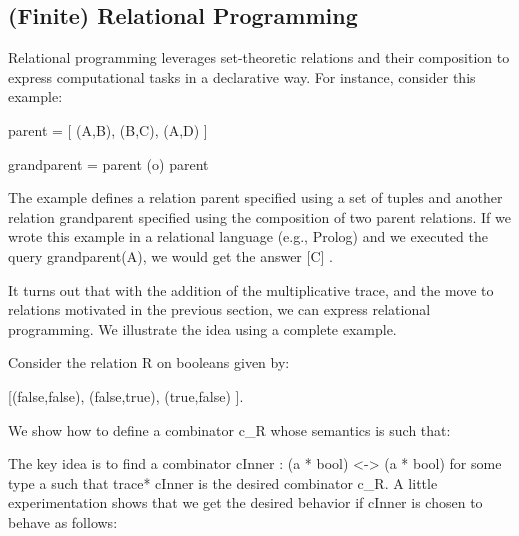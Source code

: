 \documentclass{llncs}
\begin{document}
\subsection{(Finite) Relational Programming}
\label{ch3:sec:lp}

Relational programming leverages set-theoretic relations and their
composition to express computational tasks in a declarative way. For
instance, consider this example:

{{parent = {[ (A,B), (B,C), (A,D) ]} }}

{{grandparent = parent (o) parent}}

\noindent The example defines a relation {{parent}} specified using a
set of tuples and another relation {{grandparent}} specified using the
composition of two parent relations. If we wrote this example in a
relational language (e.g., Prolog) and we executed the query
{{grandparent(A)}}, we would get the answer {{ {[C]} }}.

It turns out that with the addition of the multiplicative trace, and
the move to relations motivated in the previous section, we can
express relational programming. We illustrate the idea using a
complete example. 

Consider the relation {{R}} on booleans given by:

{{ {[(false,false), (false,true), (true,false) ]}. }}

We show how to define a combinator {{c_R}} whose semantics is such that:

%
%

The key idea is to find a combinator {{cInner : (a * bool) <-> (a * bool)}}
for some type {{a}} such that {{trace* cInner}} is the desired combinator
{{c_R}}. A little experimentation shows that we get the desired behavior
if {{cInner}} is chosen to behave as follows:

\end{document}
